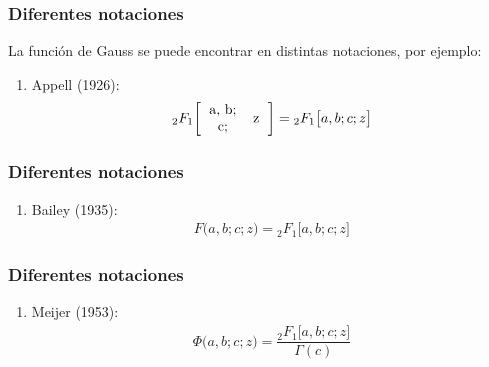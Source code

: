 \documentclass[12pt]{beamer}
\begin{document}
\begin{frame}
\frametitle{Diferentes notaciones}
La función de Gauss se puede encontrar en distintas notaciones, por ejemplo:
\pause
{}
\begin{enumerate}[<+->]
\item Appell (1926):
\pause
\begin{align}
{}_{2} F_{1} \bigg[
\begin{tabular}{c c}
a, b; & \multirow{2}{*}{z} \\
c; &
\end{tabular} \bigg] = {}_{2} F_{1} \big[ a, b; c; z \big]
\label{eq:ecuacion_01_01_01_06}
\end{align}
\seti 
\end{enumerate}
\end{frame}
\begin{frame}
\frametitle{Diferentes notaciones}
\begin{enumerate}[<+->]    
\conti
\item Bailey (1935):
\begin{align}
F \big( a, b; c; z \big) = {}_{2} F_{1} \big[ a, b; c; z \big]
\label{eq:ecuacion_01_01_01_07}
\end{align}
\seti 
\end{enumerate}
\end{frame}
\begin{frame}
\frametitle{Diferentes notaciones}
\begin{enumerate}[<+->]    
\conti
\item Meijer (1953):
\begin{align}
\Phi \big( a, b; c; z \big) = \dfrac{{}_{2} F_{1} \big[ a, b; c; z \big]}{\Gamma (c)}
\label{eq:ecuacion_01_01_01_08}
\end{align}
\seti 
\end{enumerate}
\end{frame}
\end{document}
